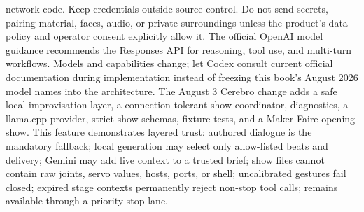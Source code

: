 {}network code. Keep credentials outside source control. Do not send secrets,\markdownRendererSoftLineBreak
{}pairing material, faces, audio, or private surroundings unless the product's\markdownRendererSoftLineBreak
{}data policy and operator consent explicitly allow it.\markdownRendererInterblockSeparator
{}\markdownRendererSectionBegin
{}\markdownRendererInterblockSeparator
{}\markdownRendererInterblockSeparator
{}The official OpenAI model guidance recommends the Responses API for reasoning,\markdownRendererSoftLineBreak
{}tool use, and multi-turn workflows. Models and capabilities change; let Codex\markdownRendererSoftLineBreak
{}consult current official documentation during implementation instead of\markdownRendererSoftLineBreak
{}freezing this book's August 2026 model names into the architecture.\markdownRendererInterblockSeparator
{}\markdownRendererThematicBreak{}\markdownRendererInterblockSeparator
{}
\markdownRendererSectionEnd 
\markdownRendererSectionEnd \markdownRendererSectionBegin
{}\markdownRendererInterblockSeparator
{}The August 3 Cerebro change adds a safe local-improvisation layer, a\markdownRendererSoftLineBreak
{}connection-tolerant show coordinator, diagnostics, a llama.cpp provider, strict\markdownRendererSoftLineBreak
{}show schemas, fixture tests, and a Maker Faire opening show.\markdownRendererParagraphSeparator
{}This feature demonstrates layered trust:\markdownRendererInterblockSeparator
{}\markdownRendererUlBegin
\markdownRendererUlItem authored dialogue is the mandatory fallback;\markdownRendererUlItemEnd 
\markdownRendererUlItem local generation may select only allow-listed beats and delivery;\markdownRendererUlItemEnd 
\markdownRendererUlItem Gemini may add live context to a trusted brief;\markdownRendererUlItemEnd 
\markdownRendererUlItem show files cannot contain raw joints, servo values, hosts, ports, or shell;\markdownRendererUlItemEnd 
\markdownRendererUlItem uncalibrated gestures fail closed;\markdownRendererUlItemEnd 
\markdownRendererUlItem expired stage contexts permanently reject non-stop tool calls;\markdownRendererUlItemEnd 
\markdownRendererUlItem {} remains available through a priority stop lane.\markdownRendererUlItemEnd 
\markdownRendererUlEnd \markdownRendererInterblockSeparator
